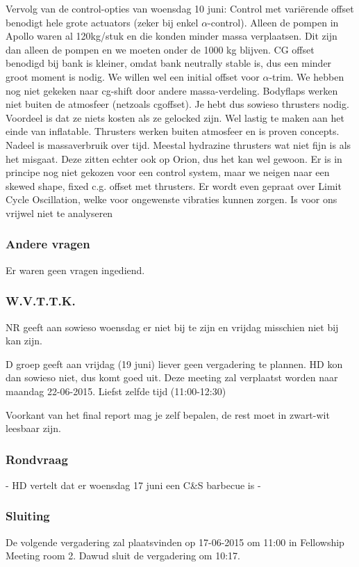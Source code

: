 \newline\newline
Vervolg van de control-opties van woensdag 10 juni:
\newline
Control met vari\"{e}rende offset benodigt hele grote actuators (zeker bij enkel $\alpha$-control). Alleen de pompen in Apollo waren al 120kg/stuk en die konden minder massa verplaatsen. Dit zijn dan alleen de pompen en we moeten onder de 1000 kg blijven. CG offset benodigd bij bank is kleiner, omdat bank neutrally stable is, dus een minder groot moment is nodig. We willen wel een initial offset voor $\alpha$-trim. We hebben nog niet gekeken naar cg-shift door andere massa-verdeling. 
\newline
Bodyflaps werken niet buiten de atmosfeer (netzoals cgoffset). Je hebt dus sowieso thrusters nodig. Voordeel is dat ze niets kosten als ze gelocked zijn. Wel lastig te maken aan het einde van inflatable.
\newline
Thrusters werken buiten atmosfeer en is proven concepts. Nadeel is massaverbruik over tijd. Meestal hydrazine thrusters wat niet fijn is als het misgaat. Deze zitten echter ook op Orion, dus het kan wel gewoon.
\newline\newline
Er is in principe nog niet gekozen voor een control system, maar we neigen naar een skewed shape, fixed c.g. offset met thrusters.
\newline\newline
Er wordt even gepraat over Limit Cycle Oscillation, welke voor ongewenste vibraties kunnen zorgen. Is voor ons vrijwel niet te analyseren

\subsubsection{Andere vragen}
Er waren geen vragen ingediend.

\subsubsection{W.V.T.T.K.}
NR geeft aan sowieso woensdag er niet bij te zijn en vrijdag misschien niet bij kan zijn.

D groep geeft aan vrijdag (19 juni) liever geen vergadering te plannen. HD kon dan sowieso niet, dus komt goed uit. Deze meeting zal verplaatst worden naar maandag 22-06-2015. Liefst zelfde tijd (11:00-12:30)

Voorkant van het final report mag je zelf bepalen, de rest moet in zwart-wit leesbaar zijn.

\subsubsection{Rondvraag}
- HD vertelt dat er woensdag 17 juni een C\&S barbecue is - 

\subsubsection{Sluiting}
De volgende vergadering zal plaatsvinden op 17-06-2015 om 11:00 in Fellowship Meeting room 2.
\newline\newline
Dawud sluit de vergadering om 10:17.